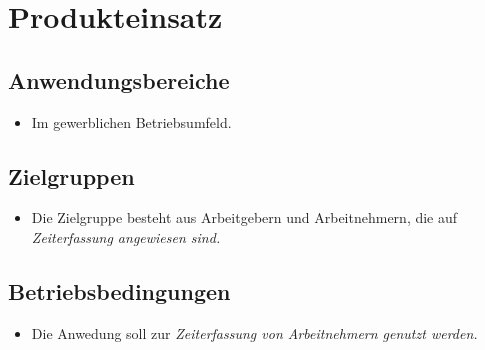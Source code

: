\section{Produkteinsatz}

\subsection{Anwendungsbereiche}
\begin{itemize}
	\item Im gewerblichen Betriebsumfeld.
\end{itemize}

\subsection{Zielgruppen}
\begin{itemize}
	\item Die Zielgruppe besteht aus Arbeitgebern und Arbeitnehmern, die auf \em Zeiterfassung \em angewiesen sind.
\end{itemize}

\subsection{Betriebsbedingungen}
\begin{itemize}
	\item Die Anwedung soll zur \em Zeiterfassung \em von Arbeitnehmern genutzt werden.
\end{itemize}
